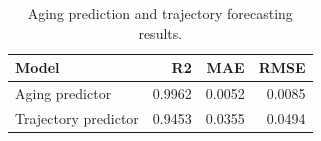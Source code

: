 \begin{table}[t]
\centering
\caption{Aging prediction and trajectory forecasting results.}
\label{tab:prediction-metrics}
\begin{tabular}{lrrr}
\toprule
Model & R2 & MAE & RMSE \\
\midrule
Aging predictor & 0.9962 & 0.0052 & 0.0085 \\
Trajectory predictor & 0.9453 & 0.0355 & 0.0494 \\
\bottomrule
\end{tabular}
\end{table}
